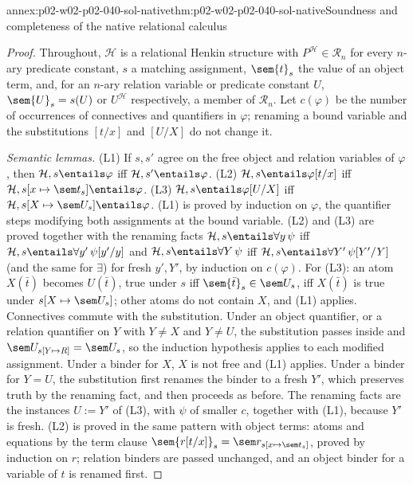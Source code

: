 \begin{annexitem}{annex:p02-w02-p02-040-sol-native}{thm:p02-w02-p02-040-sol-native}{Soundness and completeness of the native relational calculus}
\begin{proof}
Throughout, \(\mathcal H\) is a relational Henkin structure with
\(P^{\mathcal H}\in\mathcal R_n\) for every \(n\)-ary predicate constant, \(s\) a
matching assignment, \(\sem{t}_s\) the value of an object term, and, for an
\(n\)-ary relation variable or predicate constant \(U\),
\(\sem{U}_s=s(U)\) or \(U^{\mathcal H}\) respectively, a member of
\(\mathcal R_n\).  Let \(c(\varphi)\) be the number of occurrences of
connectives and quantifiers in \(\varphi\); renaming a bound variable and the
substitutions \([t/x]\) and \([U/X]\) do not change it.

\emph{Semantic lemmas.}  (L1) If \(s,s'\) agree on the free object and
relation variables of \(\varphi\), then \(\mathcal H,s\entails\varphi\) iff
\(\mathcal H,s'\entails\varphi\).  (L2)
\(\mathcal H,s\entails\varphi[t/x]\) iff
\(\mathcal H,s[x\mapsto\sem t_s]\entails\varphi\).  (L3)
\(\mathcal H,s\entails\varphi[U/X]\) iff
\(\mathcal H,s[X\mapsto\sem U_s]\entails\varphi\).  (L1) is proved by induction
on \(\varphi\), the quantifier steps modifying both assignments at the bound
variable.  (L2) and (L3) are proved together with the renaming facts
\(\mathcal H,s\entails\forall y\,\psi\) iff
\(\mathcal H,s\entails\forall y'\,\psi[y'/y]\) and
\(\mathcal H,s\entails\forall Y\,\psi\) iff
\(\mathcal H,s\entails\forall Y'\,\psi[Y'/Y]\) (and the same for \(\exists\)) for
fresh \(y',Y'\), by induction on \(c(\varphi)\).  For (L3): an atom
\(X(\bar t)\) becomes \(U(\bar t)\), true under \(s\) iff
\(\sem{\bar t}_s\in\sem U_s\), iff \(X(\bar t)\) is true under
\(s[X\mapsto\sem U_s]\); other atoms do not contain \(X\), and (L1) applies.
Connectives commute with the substitution.  Under an object quantifier, or a
relation quantifier on \(Y\) with \(Y\neq X\) and \(Y\neq U\), the substitution
passes inside and \(\sem U_{s[Y\mapsto R]}=\sem U_s\), so the induction
hypothesis applies to each modified assignment.  Under a binder for \(X\),
\(X\) is not free and (L1) applies.  Under a binder for \(Y=U\), the
substitution first renames the binder to a fresh \(Y'\), which preserves
truth by the renaming fact, and then proceeds as before.  The renaming facts
are the instances \(U:=Y'\) of (L3), with \(\psi\) of smaller \(c\), together with
(L1), because \(Y'\) is fresh.  (L2) is proved in the same pattern with
object terms: atoms and equations by the term clause
\(\sem{r[t/x]}_s=\sem r_{s[x\mapsto\sem t_s]}\), proved by induction on \(r\);
relation binders are passed unchanged, and an object binder for a variable
of \(t\) is renamed first.


\end{proof}
\end{annexitem}
